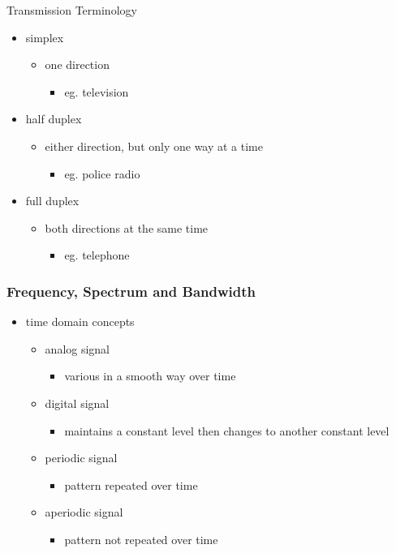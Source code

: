 \documentclass[pdflatex,compress]{beamer}
\begin{document}
\begin{frame}{Transmission Terminology}
	\begin{itemize}
		\item simplex
		\begin{itemize}
			\item one direction
			\begin{itemize}
				\item eg. television
			\end{itemize}
		\end{itemize}
		\item half duplex
		\begin{itemize}
			\item either direction, but only one way at a time
			\begin{itemize}
				\item eg. police radio
			\end{itemize}
		\end{itemize}
		\item full duplex
		\begin{itemize}
			\item both directions at the same time
			\begin{itemize}
				\item eg. telephone
			\end{itemize}
		\end{itemize}
	\end{itemize}
\end{frame}

\begin{frame}
	\frametitle{Frequency, Spectrum and Bandwidth}
	\begin{itemize}
		\item time domain concepts
		\begin{itemize}
			\item analog signal
			\begin{itemize}
				\item various in a smooth way over time
			\end{itemize}
			\item digital signal
			\begin{itemize}
				\item maintains a constant level then changes to another constant level
			\end{itemize}
			\item periodic signal
			\begin{itemize}
				\item pattern repeated over time
			\end{itemize}
			\item aperiodic signal
			\begin{itemize}
				\item pattern not repeated over time
			\end{itemize}
		\end{itemize}
	\end{itemize}
\end{frame}
\end{document}
